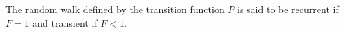 The random walk defined by the transition function $P$ is said to be recurrent if $F = 1$ and transient if $F < 1$.